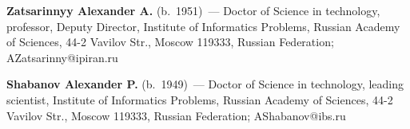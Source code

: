\Contr

\noindent
\textbf{Zatsarinnyy Alexander A.} (b.\ 1951)~---
Doctor of Science in technology, professor, Deputy Director, Institute of Informatics Problems, Russian Academy of Sciences,
44-2 Vavilov Str., Moscow 119333, Russian Federation; AZatsarinny@ipiran.ru

\vspace*{3pt}

\noindent
\textbf{Shabanov Alexander P.} (b.\ 1949)~---
 Doctor of Science in technology, leading scientist, Institute of Informatics Problems, Russian Academy of Sciences,
 44-2 Vavilov Str., Moscow 119333, Russian Federation;
 AShabanov@ibs.ru


\label{end\stat}

\renewcommand{\bibname}{\protect\rm Литература}
